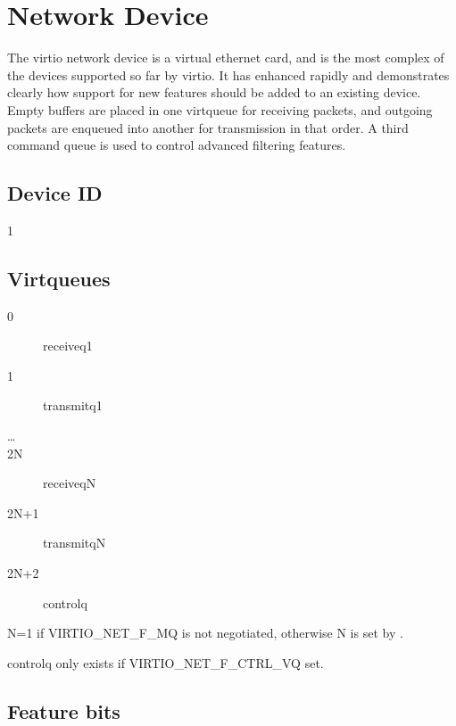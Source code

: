 \section{Network Device}\label{sec:Device Types / Network Device}

The virtio network device is a virtual ethernet card, and is the
most complex of the devices supported so far by virtio. It has
enhanced rapidly and demonstrates clearly how support for new
features should be added to an existing device. Empty buffers are
placed in one virtqueue for receiving packets, and outgoing
packets are enqueued into another for transmission in that order.
A third command queue is used to control advanced filtering
features.

\subsection{Device ID}\label{sec:Device Types / Network Device / Device ID}

 1

\subsection{Virtqueues}\label{sec:Device Types / Network Device / Virtqueues}

\begin{description}
\item[0] receiveq1
\item[1] transmitq1
\item[\ldots]
\item[2N] receiveqN
\item[2N+1] transmitqN
\item[2N+2] controlq
\end{description}

 N=1 if VIRTIO_NET_F_MQ is not negotiated, otherwise N is set by
 .

 controlq only exists if VIRTIO_NET_F_CTRL_VQ set.

\subsection{Feature bits}\label{sec:Device Types / Network Device / Feature bits}

